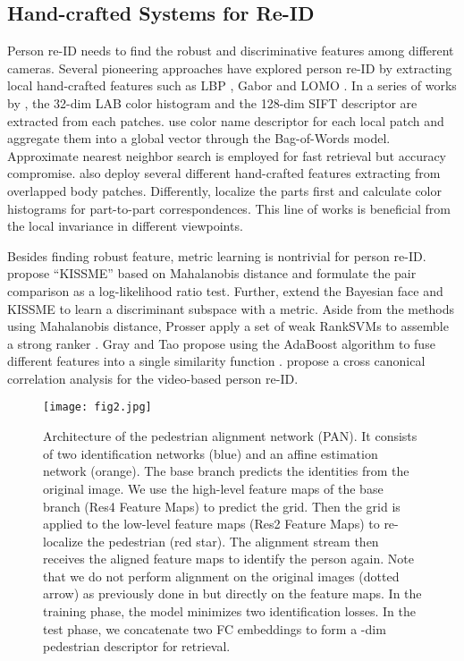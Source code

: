 \subsection{Hand-crafted Systems for Re-ID} 
Person re-ID needs to find the robust and discriminative features among different cameras. 
Several pioneering approaches have explored person re-ID by extracting local hand-crafted features such as LBP \cite{mignon2012pcca}, Gabor \cite{prosser2010person} and LOMO \cite{liao2015person}. In a series of works by \cite{zhao2014learning,zhao2013person,zhao2013unsupervised}, the 32-dim LAB color histogram and the 128-dim SIFT descriptor are extracted from each  patches. \cite{zheng2015scalable} use color name descriptor for each local patch and aggregate them into a global vector through the Bag-of-Words model. Approximate nearest neighbor search \cite{wang2012query} is employed for fast retrieval but accuracy compromise. \cite{chen2017exemplar} also deploy several different hand-crafted features extracting from overlapped body patches. Differently, \cite{cheng2011custom} localize the parts first and calculate color histograms for part-to-part correspondences. This line of works is beneficial from the local invariance in different viewpoints.

Besides finding robust feature, metric learning is nontrivial for person re-ID. \cite{kostinger2012large} propose ``KISSME'' based on Mahalanobis distance and formulate the pair comparison as a log-likelihood ratio test. Further, \cite{liao2015person} extend the Bayesian face and KISSME to learn a discriminant subspace with a metric. Aside from the methods using Mahalanobis distance, Prosser \etal apply a set of weak RankSVMs to assemble a strong ranker \cite{prosser2010person}. Gray and Tao propose using the AdaBoost algorithm to fuse different features into a single similarity function \cite{gray2008viewpoint}. \cite{loy2010time} propose a cross canonical correlation analysis for the video-based person re-ID.

\begin{figure*}[t]
\begin{center}
\texttt{[image: fig2.jpg]}
\end{center}
   \caption{Architecture of the pedestrian alignment network (PAN). It consists of two identification networks (blue) and an affine estimation network (orange). The base branch predicts the identities from the original image. We use the high-level feature maps of the base branch (Res4 Feature Maps) to predict the grid. Then the grid is applied to the low-level feature maps (Res2 Feature Maps) to re-localize the pedestrian (red star). The alignment stream then receives the aligned feature maps to identify the person again. Note that we do not perform alignment on the original images (dotted arrow) as previously done in \cite{jaderberg2015spatial} but directly on the feature maps. In the training phase, the model minimizes two identification losses. In the test phase, we concatenate two  FC embeddings to form a -dim pedestrian descriptor  for  retrieval.}
\label{fig:2}
\end{figure*}
